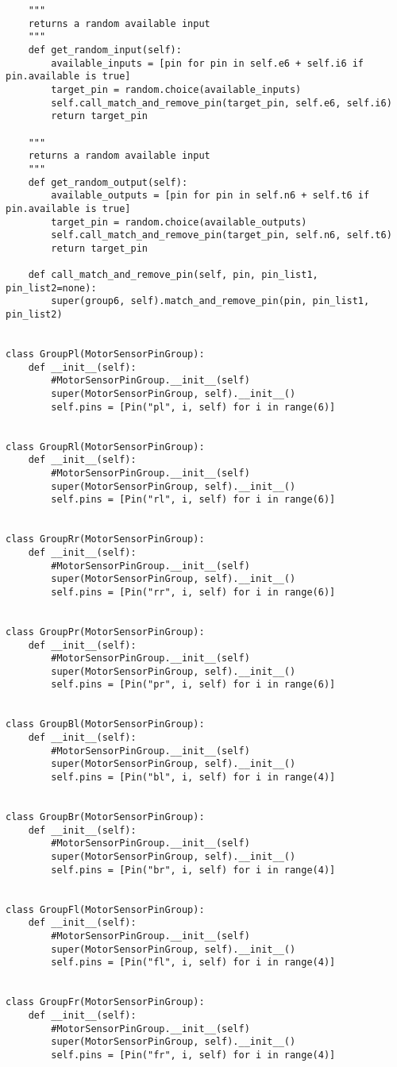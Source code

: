 \documentclass[a4paper]{article}
\begin{document}
\begin{verbatim}
    """
    returns a random available input
    """
    def get_random_input(self):
        available_inputs = [pin for pin in self.e6 + self.i6 if pin.available is true]
        target_pin = random.choice(available_inputs)
        self.call_match_and_remove_pin(target_pin, self.e6, self.i6)
        return target_pin

    """
    returns a random available input
    """
    def get_random_output(self):
        available_outputs = [pin for pin in self.n6 + self.t6 if pin.available is true]
        target_pin = random.choice(available_outputs)
        self.call_match_and_remove_pin(target_pin, self.n6, self.t6)
        return target_pin

    def call_match_and_remove_pin(self, pin, pin_list1, pin_list2=none):
        super(group6, self).match_and_remove_pin(pin, pin_list1, pin_list2)


class GroupPl(MotorSensorPinGroup):
    def __init__(self):
        #MotorSensorPinGroup.__init__(self)
        super(MotorSensorPinGroup, self).__init__()
        self.pins = [Pin("pl", i, self) for i in range(6)]


class GroupRl(MotorSensorPinGroup):
    def __init__(self):
        #MotorSensorPinGroup.__init__(self)
        super(MotorSensorPinGroup, self).__init__()
        self.pins = [Pin("rl", i, self) for i in range(6)]


class GroupRr(MotorSensorPinGroup):
    def __init__(self):
        #MotorSensorPinGroup.__init__(self)
        super(MotorSensorPinGroup, self).__init__()
        self.pins = [Pin("rr", i, self) for i in range(6)]


class GroupPr(MotorSensorPinGroup):
    def __init__(self):
        #MotorSensorPinGroup.__init__(self)
        super(MotorSensorPinGroup, self).__init__()
        self.pins = [Pin("pr", i, self) for i in range(6)]


class GroupBl(MotorSensorPinGroup):
    def __init__(self):
        #MotorSensorPinGroup.__init__(self)
        super(MotorSensorPinGroup, self).__init__()
        self.pins = [Pin("bl", i, self) for i in range(4)]


class GroupBr(MotorSensorPinGroup):
    def __init__(self):
        #MotorSensorPinGroup.__init__(self)
        super(MotorSensorPinGroup, self).__init__()
        self.pins = [Pin("br", i, self) for i in range(4)]


class GroupFl(MotorSensorPinGroup):
    def __init__(self):
        #MotorSensorPinGroup.__init__(self)
        super(MotorSensorPinGroup, self).__init__()
        self.pins = [Pin("fl", i, self) for i in range(4)]


class GroupFr(MotorSensorPinGroup):
    def __init__(self):
        #MotorSensorPinGroup.__init__(self)
        super(MotorSensorPinGroup, self).__init__()
        self.pins = [Pin("fr", i, self) for i in range(4)]
\end{verbatim}
\end{document}

